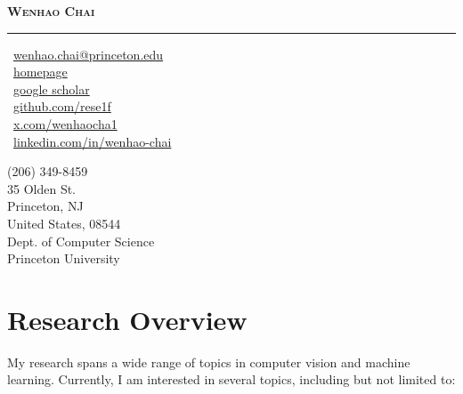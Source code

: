 \documentclass[a4paper,11pt]{article}
\newcommand{\sepspace}{\vspace{6pt}}
\begin{document}
\begin{center}
    \Large{\textbf{\textsc{Wenhao Chai}}}
\end{center}

\vspace{-18pt}

\noindent\rule{\textwidth}{0.4pt}

\vspace{0.5em}
\noindent
\begin{minipage}[t]{0.5\textwidth}
    \faEnvelope~\textcolor{linkpink}{\href{mailto:wenhao.chai@princeton.edu}{wenhao.chai@princeton.edu}}\\
    \faHome~\textcolor{linkpink}{\href{https://rese1f.github.io/}{homepage}} \\
    \faGoogle~\textcolor{linkpink}{\href{https://scholar.google.com/citations?user=SL--7UMAAAAJ&hl=en}{{google scholar}}}\\
    \faGithub~\textcolor{linkpink}{\href{https://github.com/rese1f}{{github.com/rese1f}}} \\
    \faTwitter~\textcolor{linkpink}{\href{https://x.com/wenhaocha1}{{x.com/wenhaocha1}}} \\
    \faLinkedin~\textcolor{linkpink}{\href{https://www.linkedin.com/in/wenhao-chai-658274238/}{{linkedin.com/in/wenhao-chai}}}
\end{minipage}
\begin{minipage}[t]{0.5\textwidth}
    \raggedleft
    (206) 349-8459 \\
    35 Olden St. \\
    Princeton, NJ \\
    United States, 08544 \\
    Dept. of Computer Science \\
    Princeton University\\
\end{minipage}

\section*{Research Overview}

My research spans a wide range of topics in computer vision and machine learning. Currently, I am interested in several topics, including but not limited to: 
\end{document}
